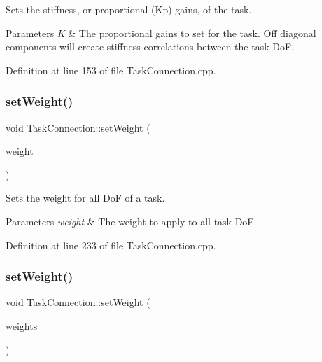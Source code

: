 Sets the stiffness, or proportional (Kp) gains, of the task. 
\begin{DoxyParams}{Parameters}
{\em K} & The proportional gains to set for the task. Off diagonal components will create stiffness correlations between the task DoF. \\
\hline
\end{DoxyParams}


Definition at line 153 of file Task\+Connection.\+cpp.

\hypertarget{classocra__recipes_1_1TaskConnection_ad833849636700c3174f305d10fcc00bf}{}\label{classocra__recipes_1_1TaskConnection_ad833849636700c3174f305d10fcc00bf} 
\subsubsection{\texorpdfstring{set\+Weight()}{setWeight()}\hspace{0.1cm}{\footnotesize\ttfamily [1/2]}}
{\footnotesize\ttfamily void Task\+Connection\+::set\+Weight (\begin{DoxyParamCaption}\item[{double}]{weight }\end{DoxyParamCaption})}

Sets the weight for all DoF of a task. 
\begin{DoxyParams}{Parameters}
{\em weight} & The weight to apply to all task DoF. \\
\hline
\end{DoxyParams}


Definition at line 233 of file Task\+Connection.\+cpp.

\hypertarget{classocra__recipes_1_1TaskConnection_ad03415eb9f2107be39cb44399fb0afd7}{}\label{classocra__recipes_1_1TaskConnection_ad03415eb9f2107be39cb44399fb0afd7} 
\subsubsection{\texorpdfstring{set\+Weight()}{setWeight()}\hspace{0.1cm}{\footnotesize\ttfamily [2/2]}}
{\footnotesize\ttfamily void Task\+Connection\+::set\+Weight (\begin{DoxyParamCaption}\item[{Eigen\+::\+Vector\+Xd \&}]{weights }\end{DoxyParamCaption})}

